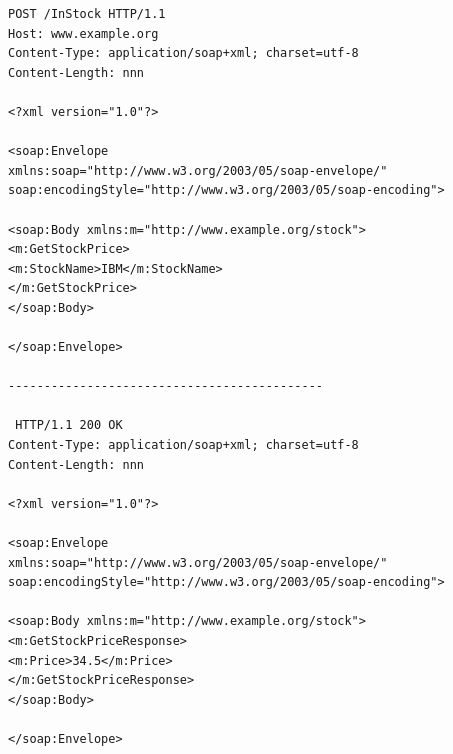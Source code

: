 \documentclass[fleqn,10pt,ngerman]{SelfArx}
\begin{document}
\begin{lstlisting}[caption=Beispiel: SOAP-Request und SOAP-Response als Envelope, label=envelopesoap]
 POST /InStock HTTP/1.1
Host: www.example.org
Content-Type: application/soap+xml; charset=utf-8
Content-Length: nnn

<?xml version="1.0"?>

<soap:Envelope
xmlns:soap="http://www.w3.org/2003/05/soap-envelope/"
soap:encodingStyle="http://www.w3.org/2003/05/soap-encoding">

<soap:Body xmlns:m="http://www.example.org/stock">
<m:GetStockPrice>
<m:StockName>IBM</m:StockName>
</m:GetStockPrice>
</soap:Body>

</soap:Envelope>

--------------------------------------------

 HTTP/1.1 200 OK
Content-Type: application/soap+xml; charset=utf-8
Content-Length: nnn

<?xml version="1.0"?>

<soap:Envelope
xmlns:soap="http://www.w3.org/2003/05/soap-envelope/"
soap:encodingStyle="http://www.w3.org/2003/05/soap-encoding">

<soap:Body xmlns:m="http://www.example.org/stock">
<m:GetStockPriceResponse>
<m:Price>34.5</m:Price>
</m:GetStockPriceResponse>
</soap:Body>

</soap:Envelope>
\end{lstlisting}
\end{document}
